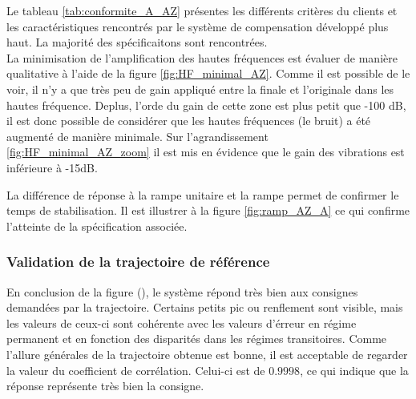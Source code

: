 \documentclass{udes_rapport} %
\begin{document}
Le tableau \ref{tab:conformite_A_AZ} présentes les différents critères du clients et les caractéristiques rencontrés par le système de compensation développé plus haut. La majorité des spécificaitons sont rencontrées.\\
La minimisation de l'amplification des hautes fréquences est évaluer de manière qualitative à l'aide de la figure \ref{fig:HF_minimal_AZ}. Comme il est possible de le voir, il n'y a que très peu de gain appliqué entre la finale et l'originale dans les hautes fréquence. Deplus, l'orde du gain de cette zone est plus petit que -100 dB, il est donc possible de considérer que les hautes fréquences (le bruit) a été augmenté de manière minimale. Sur l'agrandissement \ref{fig:HF_minimal_AZ_zoom} il est mis en évidence que le gain des vibrations est inférieure à -15dB.


La différence de réponse à la rampe unitaire et la rampe permet de confirmer le temps de stabilisation. Il est illustrer à la figure \ref{fig:ramp_AZ_A} ce qui confirme l'atteinte de la spécification associée.


\subsubsection{Validation de la trajectoire de référence} \label{valid_AZ_A}
En conclusion de la figure (), le système répond très bien aux consignes demandées par la trajectoire. Certains petits pic ou renflement sont visible, mais les valeurs de ceux-ci sont cohérente avec les valeurs d'érreur en régime permanent et en fonction des disparités dans les régimes transitoires. Comme l'allure générales de la trajectoire obtenue est bonne, il est acceptable de regarder la valeur du coefficient de corrélation. Celui-ci est de $0.9998$, ce qui indique que la réponse représente très bien la consigne.
\end{document}

